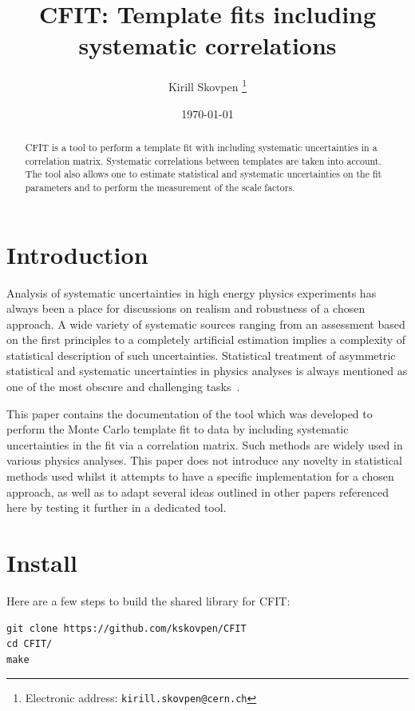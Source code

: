 \documentclass[12pt]{article}
\title{CFIT: Template fits including systematic correlations}
\author{Kirill Skovpen
\thanks{Electronic address: \texttt{kirill.skovpen@cern.ch}}}
\affil{Institut Pluridisciplinaire Hubert Curien, CNRS/IN2P3, Strasbourg, France}
\date{\today}
\begin{document}
\maketitle

\begin{abstract}
CFIT is a tool to perform a template fit with including
systematic uncertainties in a correlation matrix. Systematic
correlations between templates are taken into account. The tool also allows one to estimate
statistical and systematic uncertainties on the fit parameters and to
perform the measurement of the scale factors.
\end{abstract}

\newpage

\tableofcontents

\newpage

\section{Introduction}

Analysis of systematic uncertainties in high energy physics
experiments has always been a place for discussions on realism
and robustness of a chosen approach.
A wide variety of systematic sources ranging from an assessment based on
the first principles to a completely artificial estimation implies a
complexity of statistical description of such uncertainties.
Statistical treatment of asymmetric statistical and systematic
uncertainties in physics analyses is always mentioned as one of the
most obscure and challenging tasks~\cite{BarlowStat,Barlow}.

This paper contains the documentation
of the tool which was developed to perform the Monte Carlo template fit to data by
including systematic uncertainties in the fit via a correlation matrix.
Such methods are widely used in various physics analyses. This
paper does not introduce any novelty in statistical methods used
whilst it attempts to have a specific implementation for a chosen
approach, as well as to adapt several ideas outlined in other papers referenced
here by testing it further in a dedicated tool.

\section{Install}

Here are a few steps to build the shared library for CFIT:

\begin{verbatim}
git clone https://github.com/kskovpen/CFIT
cd CFIT/
make
\end{verbatim}
\end{document}
